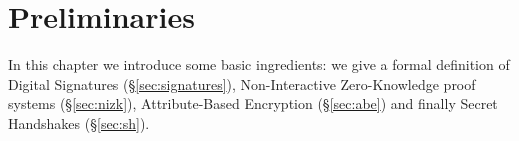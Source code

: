\chapter{Preliminaries}
In this chapter we introduce some basic ingredients: we give a formal definition of Digital Signatures (\S\ref{sec:signatures}), Non-Interactive Zero-Knowledge proof systems (\S\ref{sec:nizk}), Attribute-Based Encryption (\S\ref{sec:abe}) and finally Secret Handshakes (\S\ref{sec:sh}).





